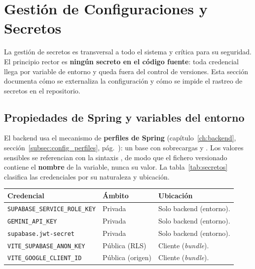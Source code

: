 \section{Gestión de Configuraciones y Secretos}
\label{sec:secretos}

La gestión de secretos es transversal a todo el sistema y crítica para su seguridad. El
principio rector es \textbf{ningún secreto en el código fuente}: toda credencial llega por
variable de entorno y queda fuera del control de versiones. Esta sección documenta cómo se
externaliza la configuración y cómo se impide el rastreo de secretos en el repositorio.

\subsection{Propiedades de Spring y variables del entorno}
\label{subsec:propiedades}

El backend usa el mecanismo de \textbf{perfiles de Spring}
(capítulo~\ref{ch:backend}, sección~\ref{subsec:config_perfiles},
pág.~\pageref{subsec:config_perfiles}): un  base con sobrecargas
 y . Los valores sensibles
se referencian con la sintaxis , de modo que el fichero
versionado contiene el \textbf{nombre} de la variable, nunca su valor. La
tabla~\ref{tab:secretos} clasifica las credenciales por su naturaleza y ubicación.

\vspace{0.2cm}
\noindent
\renewcommand{\arraystretch}{1.3}
\fontsize{8.5}{10.2}\selectfont\sffamily
\begin{tabularx}{\textwidth}{|L{4.2cm}|C{2.0cm}|Y|}
\hline
{}
\sffamily\textbf{Credencial} & \sffamily\textbf{Ámbito} & \sffamily\textbf{Ubicación} \\
\hline
\texttt{SUPABASE\_SERVICE\_ROLE\_KEY} & Privada & Solo backend (entorno). \\ \hline
{}
\texttt{GEMINI\_API\_KEY} & Privada & Solo backend (entorno). \\ \hline
\texttt{supabase.jwt-secret} & Privada & Solo backend (entorno). \\ \hline
{}
\texttt{VITE\_SUPABASE\_ANON\_KEY} & Pública (RLS) & Cliente (\textit{bundle}). \\ \hline
\texttt{VITE\_GOOGLE\_CLIENT\_ID} & Pública (origen) & Cliente (\textit{bundle}). \\ \hline
\end{tabularx}
\label{tab:secretos}

